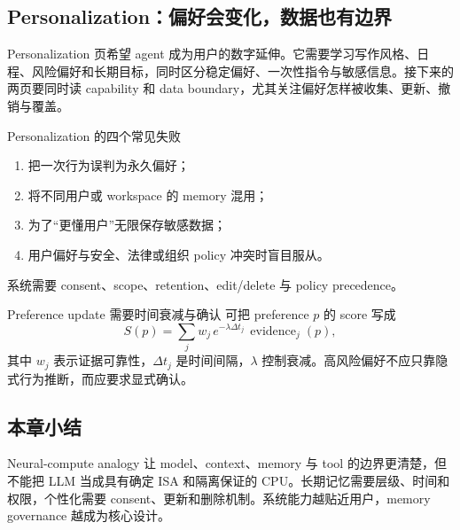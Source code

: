 
\subsection{Personalization：偏好会变化，数据也有边界}

Personalization 页希望 agent 成为用户的数字延伸。它需要学习写作风格、日程、风险偏好和长期目标，同时区分稳定偏好、一次性指令与敏感信息。接下来的两页要同时读 capability 和 data boundary，尤其关注偏好怎样被收集、更新、撤销与覆盖。




\begin{warningbox}{Personalization 的四个常见失败}
\begin{enumerate}
  \item 把一次行为误判为永久偏好；
  \item 将不同用户或 workspace 的 memory 混用；
  \item 为了“更懂用户”无限保存敏感数据；
  \item 用户偏好与安全、法律或组织 policy 冲突时盲目服从。
\end{enumerate}
系统需要 consent、scope、retention、edit/delete 与 policy precedence。
\end{warningbox}

\begin{importantbox}{Preference update 需要时间衰减与确认}
可把 preference $p$ 的 score 写成
\[
S(p)=\sum_j w_j\,e^{-\lambda\Delta t_j}\,\operatorname{evidence}_j(p),
\]
其中 $w_j$ 表示证据可靠性，$\Delta t_j$ 是时间间隔，$\lambda$ 控制衰减。高风险偏好不应只靠隐式行为推断，而应要求显式确认。
\end{importantbox}

\subsection{本章小结}

Neural-compute analogy 让 model、context、memory 与 tool 的边界更清楚，但不能把 LLM 当成具有确定 ISA 和隔离保证的 CPU。长期记忆需要层级、时间和权限，个性化需要 consent、更新和删除机制。系统能力越贴近用户，memory governance 越成为核心设计。

